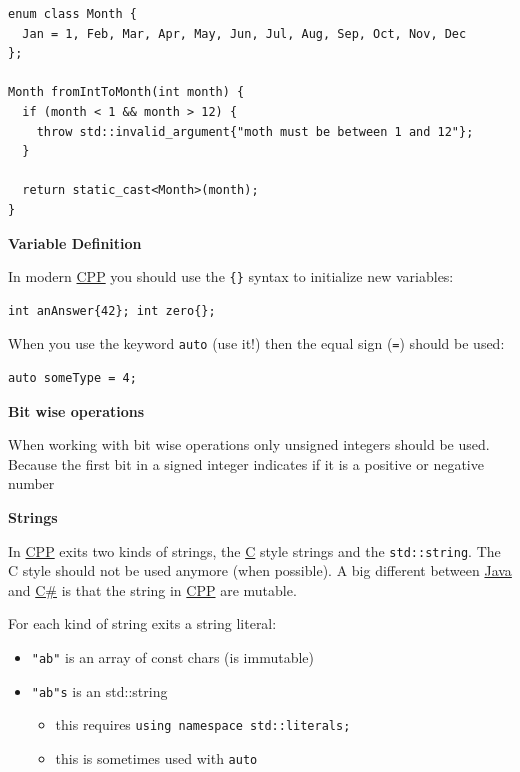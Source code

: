 \documentclass[11pt,twoside,landscape]{article}
\begin{document}
\begin{multicols}{3}
\lstset{language=c++,label= ,caption= ,captionpos=b,numbers=none}
\begin{lstlisting}
enum class Month {
  Jan = 1, Feb, Mar, Apr, May, Jun, Jul, Aug, Sep, Oct, Nov, Dec
};

Month fromIntToMonth(int month) {
  if (month < 1 && month > 12) {
    throw std::invalid_argument{"moth must be between 1 and 12"};
  }

  return static_cast<Month>(month);
}
\end{lstlisting}

\textbf{Variable Definition}

In modern \href{../../../roam/20210920103243-c.org}{CPP} you should use the \texttt{\{\}} syntax to initialize new variables:
\lstset{language=c++,label= ,caption= ,captionpos=b,numbers=none}
\begin{lstlisting}
int anAnswer{42}; int zero{};
\end{lstlisting}

When you use the keyword \texttt{auto} (use it!) then the equal sign (\texttt{=}) should be used:
\lstset{language=c++,label= ,caption= ,captionpos=b,numbers=none}
\begin{lstlisting}
auto someType = 4;
\end{lstlisting}

\textbf{Bit wise operations}

When working with bit wise operations only unsigned integers should be used.
Because the first bit in a signed integer indicates if it is a positive or negative number

\textbf{Strings}

In \href{../../../roam/20210920103243-c.org}{CPP} exits two kinds of strings, the \href{../../../roam/20211008113512-c.org}{C} style strings and the \texttt{std::string}.
The C style should not be used anymore (when possible).
A big different between \href{../../../roam/20201116150053-java.org}{Java} and \href{../../../roam/20211003114158-c.org}{C\#} is that the string in \href{../../../roam/20210920103243-c.org}{CPP} are mutable. 

For each kind of string exits a string literal:
\begin{itemize}
\item \texttt{"ab"} is an array of const chars (is immutable)
\item \texttt{"ab"s} is an std::string
\begin{itemize}
\item this requires \texttt{using namespace std::literals;}
\item this is sometimes used with \texttt{auto}
\end{itemize}
\end{itemize}



\end{multicols}
\end{document}
